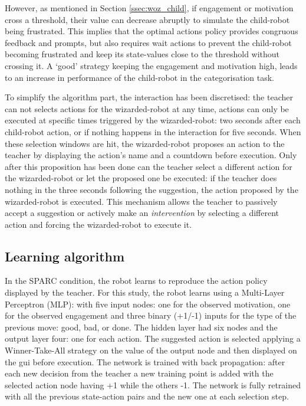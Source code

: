 However, as mentioned in Section \ref{ssec:woz_child}, if engagement or motivation cross a threshold, their value can decrease abruptly to simulate the child-robot being frustrated. This implies that the optimal actions policy provides congruous feedback and prompts, but also requires wait actions to prevent the child-robot becoming frustrated and keep its state-values close to the threshold without crossing it. A `good' strategy keeping the engagement and motivation high, leads to an increase in performance of the child-robot in the categorisation task.

To simplify the algorithm part, the interaction has been discretised: the teacher can not selects actions for the wizarded-robot at any time, actions can only be executed at specific times triggered by the wizarded-robot: two seconds after each child-robot action, or if nothing happens in the interaction for five seconds. When these selection windows are hit, the wizarded-robot proposes an action to the teacher by displaying the action's name and a countdown before execution. Only after this proposition has been done can the teacher select a different action for the wizarded-robot or let the proposed one be executed: if the teacher does nothing in the three seconds following the suggestion, the action proposed by the wizarded-robot is executed. This mechanism allows the teacher to passively accept a suggestion or actively make an \emph{intervention} by selecting a different action and forcing the wizarded-robot to execute it.

\subsection{Learning algorithm}

In the SPARC condition, the robot learns to reproduce the action policy displayed by the teacher. For this study, the robot learns using a Multi-Layer Perceptron (MLP): with five input nodes: one for the observed motivation, one for the observed engagement and three binary (+1/-1) inputs for the type of the previous move: good, bad, or done. The hidden layer had six nodes and the output layer four: one for each action. The suggested action is selected applying a Winner-Take-All strategy on the value of the output node and then displayed on the \gls{gui} before execution. The network is trained with back propagation: after each new decision from the teacher a new training point is added with the selected action node having +1 while the others -1. The network is fully retrained with all the previous state-action pairs and the new one at each selection step. 

